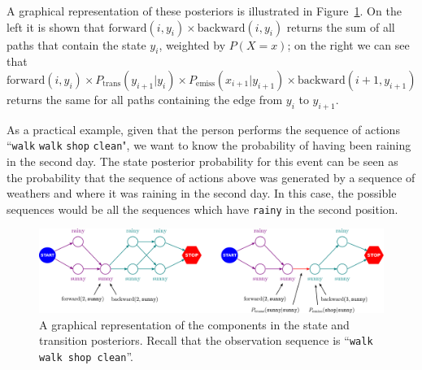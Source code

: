 A graphical representation of these posteriors is illustrated in Figure~\ref{fig:posteriors}. 
On the left it is shown that $\mathrm{forward}(i, y_i)  \times \mathrm{backward}(i, y_i)$ returns the sum of all paths that contain the state $y_i$, weighted by $P(X=x)$; on the right we can see that $\mathrm{forward}(i, y_i) \times P_{\mathrm{trans}}(y_{i+1}|y_i) \times P_{\mathrm{emiss}}(x_{i+1}|y_{i+1}) \times \mathrm{backward}(i+1, y_{i+1})$  returns the same for all paths containing the edge from $y_i$ to $y_{i+1}$.

As a practical example, given that the person performs the sequence of actions ``{\tt walk} {\tt walk} {\tt shop} {\tt clean}", we want to know the probability of having been raining in the second day. The state posterior probability for this event can be seen as the probability that the sequence of actions above was generated by a sequence of weathers and where it was raining in the second day. In this case, the possible sequences would be all the sequences which have {\tt rainy} in the second position.

\begin{figure}
\begin{center}
\includegraphics[width=1\textwidth]{figs/sequences/posteriors}
\caption[Posterior Illustration.]{\label{fig:posteriors} A graphical representation of the components in the state and transition posteriors. Recall that the observation sequence is ``\texttt{walk walk shop clean}''.}
\end{center}
\end{figure}

%
%

